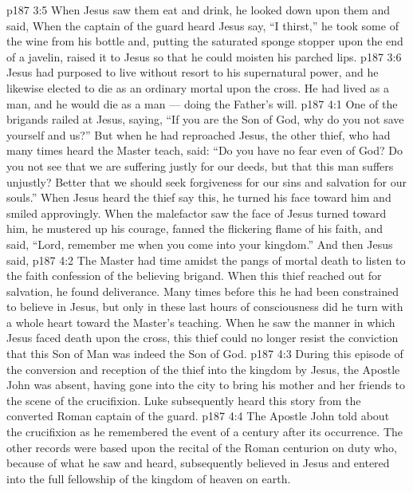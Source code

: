 \vs p187 3:5 When Jesus saw them eat and drink, he looked down upon them and said,  When the captain of the guard heard Jesus say, “I thirst,” he took some of the wine from his bottle and, putting the saturated sponge stopper upon the end of a javelin, raised it to Jesus so that he could moisten his parched lips.
\vs p187 3:6 Jesus had purposed to live without resort to his supernatural power, and he likewise elected to die as an ordinary mortal upon the cross. He had lived as a man, and he would die as a man --- doing the Father’s will.
\vs p187 4:1 One of the brigands railed at Jesus, saying, “If you are the Son of God, why do you not save yourself and us?” But when he had reproached Jesus, the other thief, who had many times heard the Master teach, said: “Do you have no fear even of God? Do you not see that we are suffering justly for our deeds, but that this man suffers unjustly? Better that we should seek forgiveness for our sins and salvation for our souls.” When Jesus heard the thief say this, he turned his face toward him and smiled approvingly. When the malefactor saw the face of Jesus turned toward him, he mustered up his courage, fanned the flickering flame of his faith, and said, “Lord, remember me when you come into your kingdom.” And then Jesus said, 
\vs p187 4:2 The Master had time amidst the pangs of mortal death to listen to the faith confession of the believing brigand. When this thief reached out for salvation, he found deliverance. Many times before this he had been constrained to believe in Jesus, but only in these last hours of consciousness did he turn with a whole heart toward the Master’s teaching. When he saw the manner in which Jesus faced death upon the cross, this thief could no longer resist the conviction that this Son of Man was indeed the Son of God.
\vs p187 4:3 \pc During this episode of the conversion and reception of the thief into the kingdom by Jesus, the Apostle John was absent, having gone into the city to bring his mother and her friends to the scene of the crucifixion. Luke subsequently heard this story from the converted Roman captain of the guard.
\vs p187 4:4 The Apostle John told about the crucifixion as he remembered the event  of a century after its occurrence. The other records were based upon the recital of the Roman centurion on duty who, because of what he saw and heard, subsequently believed in Jesus and entered into the full fellowship of the kingdom of heaven on earth.
